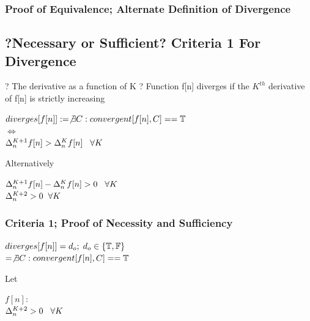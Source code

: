 \documentclass[11pt]{article}
\begin{document}
\subsubsection{Proof of Equivalence; Alternate Definition of Divergence}





\subsection{?Necessary or Sufficient? Criteria 1 For Divergence}
? The derivative as a function of K ?
Function f[n] diverges if the $K^{th}$ derivative of f[n] is strictly increasing
\vspace{1mm}
\begin{center}
$
diverges \lbrack f \lbrack n \rbrack \rbrack := \not \exists C : convergent[f[n],C] == \mathbb{T}
$
\\ \vspace{4mm}
$
\Longleftrightarrow
$
\\ \vspace{4mm}
$
\Delta_n^{K+1} f[n] > \Delta_n^{K}f[n] \hspace{3mm} \forall K
$
\end{center}
Alternatively
\begin{center}
$
\Delta_n^{K+1} f[n] - \Delta_n^{K}f[n] > 0 \hspace{3mm} \forall K
$
\\ \vspace{4mm}
$
\Delta_{n}^{K+2} > 0 \hspace{2mm} \forall K
$
\end{center}






\subsubsection{Criteria 1; Proof of Necessity and Sufficiency}
\begin{center}
$
diverges \lbrack f \lbrack n \rbrack \rbrack = d_o; \hspace{1mm} d_o \in \{\mathbb{T},\mathbb{F}\}
$
\\ \vspace{4mm}
$
= \not \exists C : convergent[f[n],C] == \mathbb{T}
$
\end{center}
Let
\begin{center}
$
f[n] :
$
\\ \vspace{2mm}
$
\Delta_{n}^{K+2} > 0 \hspace{3mm} \forall K
$
\end{center}
\end{document}
